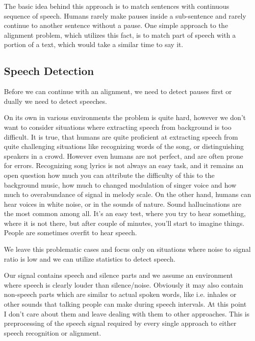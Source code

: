 \documentclass[12pt,a4paper,english]{article}
\begin{document}
The basic idea behind this approach is to match sentences with continuous sequence of speech.
Humans rarely make pauses inside a sub-sentence and rarely continue to another sentence without a pause. \newline
One simple approach to the alignment problem, which utilizes this fact, is to match part of speech with a portion of a text,
which would take a similar time to say it. \newline \newline

\subsection{Speech Detection}

Before we can continue with an alignment, we need to detect pauses first or dually we need to detect speeches. \newline

On its own in various environments  the problem is quite hard, however we don't want to consider situations where extracting speech from background is too difficult. It is true, that humans are quite proficient at extracting speech from quite challenging situations like recognizing words of the song, or distinguishing speakers in a crowd.
However even humans are not perfect, and are often prone for errors. Recognizing song lyrics is not always an easy task, and it remains an open question how much you can attribute the difficulty of this to the background music, how much to changed modulation of singer voice and how much to overabundance of signal in melody scale.
On the other hand, humans can hear voices in white noise, or in the sounds of nature. Sound hallucinations are the most common among all. It's an easy test, where you try to hear something, where it is not there, but after couple of minutes, you'll start to imagine things. People are sometimes overfit to hear speech. \newline

We leave this problematic cases and focus only on situations where noise to signal ratio is low and we can utilize statistics to detect speech. \newline

Our signal contains speech and silence parts and we assume an environment where speech is clearly louder than silence/noise. Obviously it may also contain non-speech parts which are similar to actual spoken words, like i.e. inhales or other sounds that talking people can make during speech intervals. At this point I don't care about them and leave dealing with them to other approaches. \newline
This is preprocessing of the speech signal required by every single approach to either speech recognition or alignment. 
\end{document}
